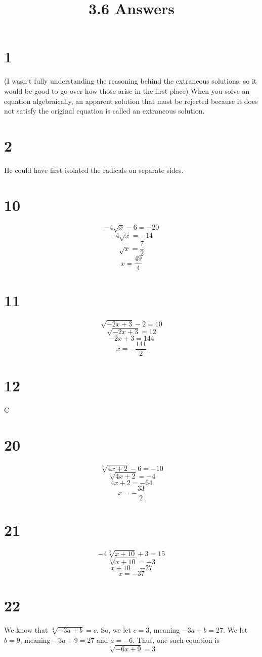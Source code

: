 \documentclass{article}
\title{3.6 Answers}
\theoremstyle{definition}
\begin{document}
\maketitle

\section*{1}
(I wasn't fully understanding the reasoning behind the extraneous solutions, so it would be good to go over how those arise in the first place)\newline
When you solve an equation algebraically, an apparent solution that must be rejected because it does not satisfy the original equation is called 
an extraneous solution.

\section*{2}
He could have first isolated the radicals on separate sides.

\section*{10}
\[ -4\sqrt{x}-6=-20 \] \[ -4\sqrt{x}=-14 \] \[ \sqrt{x}=\frac{7}{2} \] \[ x=\frac{49}{4} \]

\section*{11}
\[ \sqrt{-2x+3}-2=10 \] \[ \sqrt{-2x+3}=12 \] \[ -2x+3=144 \] \[ x=-\frac{141}{2} \]

\section*{12}
C

\section*{20}
\[ \sqrt[3]{4x+2}-6=-10 \] \[ \sqrt[3]{4x+2}=-4 \] \[ 4x+2=-64 \] \[ x=-\frac{33}{2} \]

\section*{21}
\[ -4\sqrt[3]{x+10}+3=15 \] \[ \sqrt[3]{x+10}=-3 \] \[ x+10=-27 \] \[ x=-37 \]

\section*{22}
We know that $\sqrt[3]{-3a+b}=c$. So, we let $c=3$, meaning $-3a+b=27$. We let $b=9$, meaning $-3a+9=27$ and $a=-6$. Thus, one such equation is 
\[ \sqrt[3]{-6x+9}=3 \]
\end{document}
